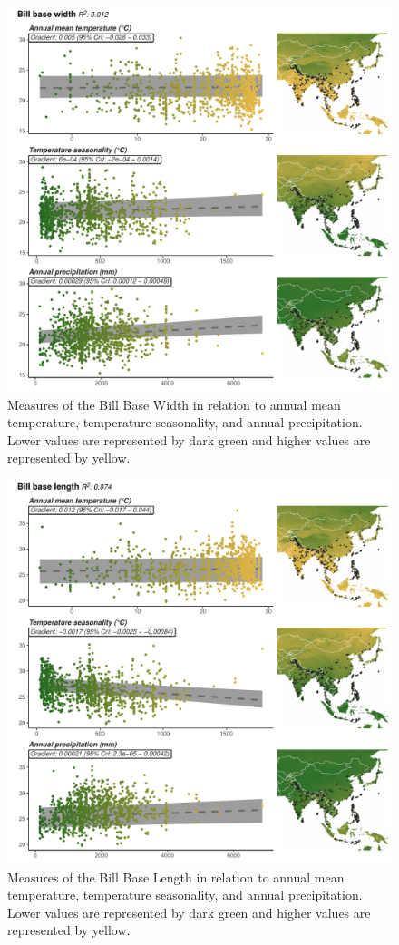 \documentclass[10pt,a4paper]{article}
\begin{document}
\begin{figure}
\includegraphics[width=0.9\linewidth]{../Figures/climMap_Bill.base.width} \caption{Measures of the Bill Base Width in relation to annual mean temperature, temperature seasonality, and annual precipitation. Lower values are represented by dark green and higher values are represented by yellow.}\label{fig:climateComparisonMapBiBaWi}
\end{figure}

\begin{figure}
\includegraphics[width=0.9\linewidth]{../Figures/climMap_Bill.base.length} \caption{Measures of the Bill Base Length in relation to annual mean temperature, temperature seasonality, and annual precipitation. Lower values are represented by dark green and higher values are represented by yellow.}\label{fig:climateComparisonMapBiBaLe}
\end{figure}
\end{document}
